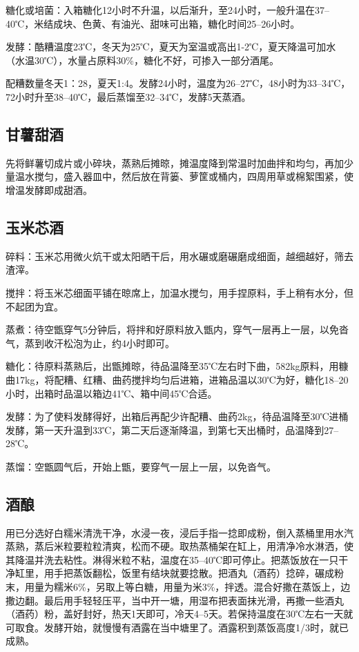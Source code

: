 \documentclass{ctexbook}
\begin{document}
糖化或培菌：入箱糖化12小时不升温，以后渐升，至24小时，一般升温在37--40℃，米结成块、色黄、有油光、甜味可出箱，糖化时间25--26小时。

发酵：酷糟温度23℃，冬天为25℃，夏天为室温或高出1-2℃，夏天降温可加水（水温30℃），水量占原料30\%，糖化不好，可掺入一部分酒尾。

配糟数量冬天1：28，夏天1:4。发酵24小时，温度为26--27℃，48小时为33--34℃，72小时升至38--40℃，最后蒸馏至32--34℃，发酵5天蒸酒。
\subsection{甘薯甜酒}
先将鲜薯切成片或小碎块，蒸熟后摊晾，摊温度降到常温时加曲拌和均匀，再加少量温水搅匀，盛入器皿中，然后放在背篓、萝筐或桶内，四周用草或棉絮围紧，使增温发酵即成甜酒。
\subsection{玉米芯酒}
碎料：玉米芯用微火炕干或太阳晒干后，用水碾或磨碾磨成细面，越细越好，筛去渣滓。

搅拌：将玉米芯细面平铺在晾席上，加温水搅匀，用手捏原料，手上稍有水分，但不起团为宜。

蒸煮：待空甑穿气5分钟后，将拌和好原料放入甑内，穿气一层再上一层，以免沓气，蒸到收汗松泡为止，约4小时即可。

糖化：待原料蒸熟后，出甑摊晾，待品温降至35℃左右时下曲，582kg原料，用糠曲17kg，将配糟、红糟、曲药搅拌均匀后进箱，进箱品温以30℃为好，糖化18--20小时，出箱时品温以箱边41℃、箱中间45℃合适。

发酵：为了使料发酵得好，出箱后再配少许配糟、曲药2kg，待品温降至30℃进桶发酵，第一天升温到33℃，第二天后逐渐降温，到第七天出桶时，品温降到27--28℃。

蒸馏：空甑圆气后，开始上甑，要穿气一层上一层，以免沓气。
\subsection{酒酿}
用已分选好白糯米清洗干净，水浸一夜，浸后手指一捻即成粉，倒入蒸桶里用水汽蒸熟，蒸后米粒要粒粒清爽，松而不硬。取热蒸桶架在缸上，用清净冷水淋洒，使其降温并洗去粘性。淋得米粒不粘，温度在35--40℃即可停止。把蒸饭放在一只干净缸里，用手把蒸饭翻松，饭里有结块就要捻散。把酒丸（酒药）捻碎，碾成粉末，用量为糯米6\%，另取上等白糖，用量为米3\%，拌透。混合好撒在蒸饭上，边撒边翻。最后用手轻轻压平，当中开一塘，用湿布把表面抹光滑，再撒一些酒丸（酒药）粉，盖好封好，热天1天即可，冷天4--5天。若保持温度在30℃左右一天就可取食。发酵开始，就慢慢有酒露在当中塘里了。酒露积到蒸饭高度1/3时，就已成熟。
\end{document}
